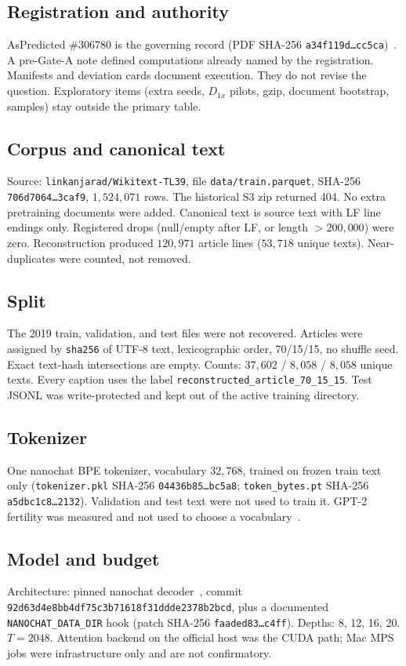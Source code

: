 \documentclass[11pt,a4paper]{article}
\begin{document}
\subsection{Registration and authority}
AsPredicted \#306780 is the governing record (PDF SHA-256 \texttt{a34f119d\ldots cc5ca})~\cite{aspredicted306780}. A pre-Gate-A note defined computations already named by the registration. Manifests and deviation cards document execution. They do not revise the question. Exploratory items (extra seeds, $D_{1x}$ pilots, gzip, document bootstrap, samples) stay outside the primary table.

\subsection{Corpus and canonical text}
Source: \texttt{linkanjarad/Wikitext-TL39}, file \texttt{data/train.parquet}, SHA-256 \texttt{706d7064\ldots 3caf9}, $1{,}524{,}071$ rows. The historical S3 zip returned 404. No extra pretraining documents were added. Canonical text is source text with LF line endings only. Registered drops (null/empty after LF, or length $>200{,}000$) were zero. Reconstruction produced $120{,}971$ article lines ($53{,}718$ unique texts). Near-duplicates were counted, not removed.

\subsection{Split}
The 2019 train, validation, and test files were not recovered. Articles were assigned by \texttt{sha256} of UTF-8 text, lexicographic order, 70/15/15, no shuffle seed. Exact text-hash intersections are empty. Counts: $37{,}602$ / $8{,}058$ / $8{,}058$ unique texts. Every caption uses the label \texttt{reconstructed\_article\_70\_15\_15}. Test JSONL was write-protected and kept out of the active training directory.

\subsection{Tokenizer}
One nanochat BPE tokenizer, vocabulary $32{,}768$, trained on frozen train text only (\texttt{tokenizer.pkl} SHA-256 \texttt{04436b85\ldots bc5a8}; \texttt{token\_bytes.pt} SHA-256 \texttt{a5dbc1c8\ldots 2132}). Validation and test text were not used to train it. GPT-2 fertility was measured and not used to choose a vocabulary~\cite{radford2019gpt2}.

\subsection{Model and budget}
Architecture: pinned nanochat decoder~\cite{karpathy2026nanochat}, commit \texttt{92d63d4e8bb4df75c3b71618f31ddde2378b2bcd}, plus a documented \texttt{NANOCHAT\_DATA\_DIR} hook (patch SHA-256 \texttt{faaded83\ldots c4ff}). Depths: 8, 12, 16, 20. $T=2048$. Attention backend on the official host was the CUDA path; Mac MPS jobs were infrastructure only and are not confirmatory.
\end{document}
